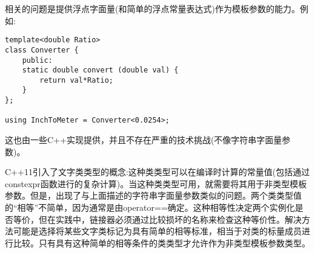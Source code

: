 相关的问题是提供浮点字面量(和简单的浮点常量表达式)作为模板参数的能力。例如:

\begin{lstlisting}[style=styleCXX]
template<double Ratio>
class Converter {
	public:
	static double convert (double val) {
		return val*Ratio;
	}
};

using InchToMeter = Converter<0.0254>;
\end{lstlisting}

这也由一些C++实现提供，并且不存在严重的技术挑战(不像字符串字面量参数)。

C++11引入了文字类类型的概念:这种类类型可以在编译时计算的常量值(包括通过constexpr函数进行的复杂计算)。当这种类类型可用，就需要将其用于非类型模板参数。但是，出现了与上面描述的字符串字面量参数类似的问题。两个类类型值的“相等”不简单，因为通常是由operator==确定。这种相等性决定两个实例化是否等价，但在实践中，链接器必须通过比较损坏的名称来检查这种等价性。解决方法可能是选择将某些文字类标记为具有简单的相等标准，相当于对类的标量成员进行比较。只有具有这种简单的相等条件的类类型才允许作为非类型模板参数类型。




































